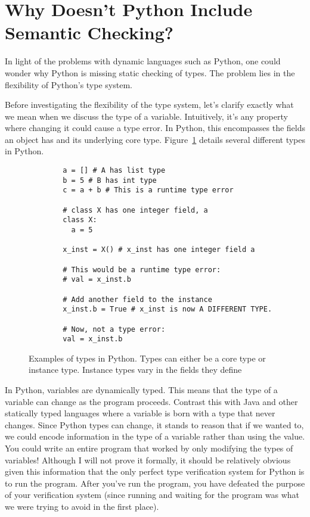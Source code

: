 \documentclass{article}[12pt]
\begin{document}
\section{Why Doesn't Python Include Semantic Checking?}
In light of the problems with dynamic languages such as Python, one could wonder why Python is missing
static checking of types. The problem lies in the flexibility of Python's type system. 

Before investigating the flexibility of the type system, let's clarify exactly what we mean when we
discuss the type of a variable. Intuitively, it's any property where changing it could cause a type
error. In Python, this encompasses the fields an object has and its underlying core type.
Figure~\ref{fig:pythontypes} details several different types in Python.

\begin{figure}
    \begin{verbatim}
        a = [] # A has list type
        b = 5 # B has int type
        c = a + b # This is a runtime type error

        # class X has one integer field, a
        class X:
          a = 5

        x_inst = X() # x_inst has one integer field a

        # This would be a runtime type error:
        # val = x_inst.b
        
        # Add another field to the instance
        x_inst.b = True # x_inst is now A DIFFERENT TYPE. 
        
        # Now, not a type error:
        val = x_inst.b
    \end{verbatim}
    \caption{Examples of types in Python. Types can either be a core type or instance type. Instance
    types vary in the fields they define}
    \label{fig:pythontypes}
\end{figure}

In Python, variables are dynamically typed. This means that the type of a variable can change as
the program proceeds. Contrast this with Java and other statically typed languages where a variable
is born with a type that never changes. Since Python types can change, it stands to reason that if
we wanted to, we could encode information in the type of a variable rather than using the value. You
could write an entire program that worked by only modifying the types of variables!  Although I will
not prove it formally, it should be relatively obvious given this information that the only perfect
type verification system for Python is to run the program.  After you've run the program, you have
defeated the purpose of your verification system (since running and waiting for the program was what we
were trying to avoid in the first place).
\end{document}
